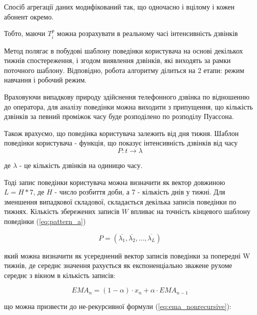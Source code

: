 Спосіб агрегації даних модифікований так, що одночасно і вцілому і кожен абонент окремо.\TBD %

Тобто, маючи ${T_i^p}$ можна 
розрахувати в 
реальному часі інтенсивність дзвінків\TBD


Метод полягає в побудові шаблону поведінки користувача на основі декількох тижнів спостереження, і згодом виявлення дзвінків, які виходять за рамки поточного шаблону. Відповідно, робота алгоритму ділиться на 2 етапи: режим навчання і робочий режим.

Враховуючи випадкову природу здійснення телефонного дзвінка по відношенню до оператора, для аналізу поведінки можна виходити з припущення, що кількість дзвінків за певний проміжок часу буде розподілено по розподілу Пуассона.

Також врахуємо, що поведінка користувача залежить від дня тижня. Шаблон поведінки користувача - функція, що показує інтенсивність дзвінків від часу
\begin{equation}\label{eq:pattern_a}P: t \rightarrow \lambda \end{equation}

\begin{ESKDexplanation}
  \item де $\lambda$ - це кількість дзвінків на одиницю часу.
\end{ESKDexplanation}

Тоді запис поведінки користувача можна визначити як вектор довжиною $L = H * 7$, де $H$ - число розбиття доби, а 7 - кількість днів у тижні. Для зменшення випадкової складової, складається декілька записів поведінки по тижнях. Кількість збережених записів $W$ впливає на точність кінцевого шаблону поведінки (\ref{eq:pattern_a})

\begin{equation}\label{eq:pattern_a2}P = (\overline{\lambda_1}, \overline{\lambda_2}, ..., \overline{\lambda_L}) \end{equation}

який можна визначити як усереднений вектор записів поведінки за попередні W тижнів, де середнє значення рахується як експоненціально зважене рухоме середнє з вікном в кількість записів:

\begin{equation}\label{eq:ema}EMA_n = (1-\alpha) \cdot x_n + \alpha \cdot EMA_{n-1} \end{equation}

що можна призвести до не-рекурсивної формули (\ref{eq:ema_nonrecursive}):

